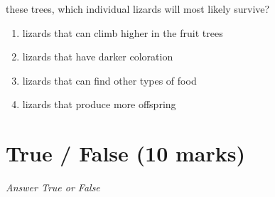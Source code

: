 \documentclass[12pt]{article}
\begin{document}
\begin{enumerate}[label=\arabic*.]
these trees, which individual lizards will most likely survive?
\begin{enumerate}[label=(\alph*)]
    \item lizards that can climb higher in the fruit trees
    \item lizards that have darker coloration
    \item lizards that can find other types of food
    \item lizards that produce more offspring
\end{enumerate}
\end{enumerate}

\section*{True / False (10 marks)}
\textit{Answer True or False}
\end{document}
